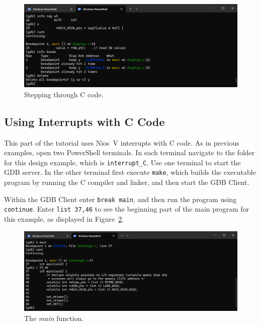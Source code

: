 \documentclass[11pt, twoside, pdftex]{article}
\begin{document}
\begin{figure}[H]
    \begin{center}
        \includegraphics[scale=.6]{figures/display_C4.png}
        \caption{Stepping through C code.}
        \label{fig:display_C4}
    \end{center}
\end{figure}

\subsection{Using Interrupts with C Code}

This part of the tutorial uses Nios~V interrupts with C code. 
As in previous examples, open two PowerShell terminals. In each terminal 
navigate to the folder for this design example, which is \texttt{interrupt\_C}. Use one 
terminal to start the GDB server. In the other terminal first execute \texttt{make}, which 
builds the executable program by running the C compiler and linker, and then start the GDB 
Client.

Within the GDB Client enter \texttt{break main}, and then run the program using \texttt{continue}.
Enter \texttt{list 37,46} to see the beginning part of the main program for this example, as 
displayed in Figure~\ref{fig:interrupt_C1}.

\begin{figure}[h]
    \begin{center}
        \includegraphics[scale=.6]{figures/interrupt_C1.png}
        \caption{The {\it main} function.}
        \label{fig:interrupt_C1}
    \end{center}
\end{figure}
\end{document}
